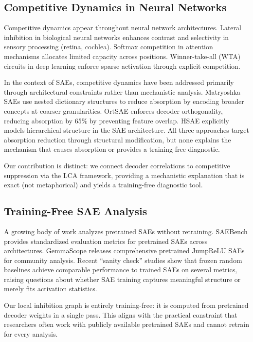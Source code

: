 \documentclass{article}
\begin{document}
\subsection{Competitive Dynamics in Neural Networks}

Competitive dynamics appear throughout neural network architectures. Lateral inhibition in biological neural networks enhances contrast and selectivity in sensory processing (retina, cochlea). Softmax competition in attention mechanisms allocates limited capacity across positions. Winner-take-all (WTA) circuits in deep learning enforce sparse activation through explicit competition.

In the context of SAEs, competitive dynamics have been addressed primarily through architectural constraints rather than mechanistic analysis. Matryoshka SAEs \citep{bussmann2025matryoshka} use nested dictionary structures to reduce absorption by encoding broader concepts at coarser granularities. OrtSAE \citep{korznikov2025ort} enforces decoder orthogonality, reducing absorption by 65\% by preventing feature overlap. HSAE \citep{luo2026hsae} explicitly models hierarchical structure in the SAE architecture. All three approaches target absorption reduction through structural modification, but none explains the mechanism that causes absorption or provides a training-free diagnostic.

Our contribution is distinct: we connect decoder correlations to competitive suppression via the LCA framework, providing a mechanistic explanation that is exact (not metaphorical) and yields a training-free diagnostic tool.

\subsection{Training-Free SAE Analysis}

A growing body of work analyzes pretrained SAEs without retraining. SAEBench \citep{karvonen2025saebench} provides standardized evaluation metrics for pretrained SAEs across architectures. GemmaScope \citep{lieberum2024gemmascope} releases comprehensive pretrained JumpReLU SAEs for community analysis. Recent ``sanity check'' studies show that frozen random baselines achieve comparable performance to trained SAEs on several metrics, raising questions about whether SAE training captures meaningful structure or merely fits activation statistics.

Our local inhibition graph is entirely training-free: it is computed from pretrained decoder weights in a single pass. This aligns with the practical constraint that researchers often work with publicly available pretrained SAEs and cannot retrain for every analysis.
\end{document}
